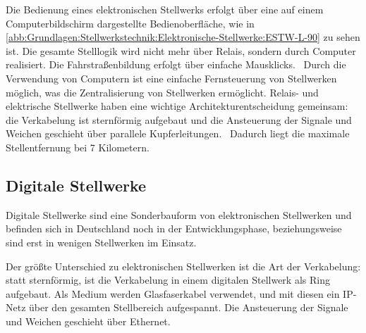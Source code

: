 Die Bedienung eines elektronischen Stellwerks erfolgt über eine auf einem Computerbildschirm dargestellte Bedienoberfläche, wie in \autoref{abb:Grundlagen:Stellwerkstechnik:Elektronische-Stellwerke:ESTW-L-90} zu sehen ist. Die gesamte Stelllogik wird nicht mehr über Relais, sondern durch Computer realisiert. Die Fahrstraßenbildung erfolgt über einfache Mausklicks.~\cite[][S.200 ff.]{bib:Sicherung-des-Schienenverkehrs} Durch die Verwendung von Computern ist eine einfache Fernsteuerung von Stellwerken möglich, was die Zentralisierung von Stellwerken ermöglicht. Relais- und elektrische Stellwerke haben eine wichtige Architekturentscheidung gemeinsam: die Verkabelung ist sternförmig aufgebaut und die Ansteuerung der Signale und Weichen geschieht über parallele Kupferleitungen.~\cite[][S.196]{bib:Sicherung-des-Schienenverkehrs} Dadurch liegt die maximale Stellentfernung bei 7 Kilometern.~\cite{bib:DB:Stellwerke}

\subsection{Digitale Stellwerke}\label{text:Grundlagen:Stellwerkstechnik:Digitale-Stellwerke}

Digitale Stellwerke sind eine Sonderbauform von elektronischen Stellwerken und befinden sich in Deutschland noch in der Entwicklungsphase, beziehungsweise sind erst in wenigen Stellwerken im Einsatz.

Der größte Unterschied zu elektronischen Stellwerken ist die Art der Verkabelung: statt sternförmig, ist die Verkabelung in einem digitalen Stellwerk als Ring aufgebaut. Als Medium werden Glasfaserkabel verwendet, und mit diesen ein IP-Netz über den gesamten Stellbereich aufgespannt. Die Ansteuerung der Signale und Weichen geschieht über Ethernet.~\cite[][S.196 ff.]{bib:Sicherung-des-Schienenverkehrs}
